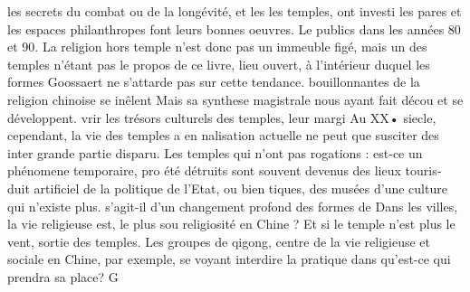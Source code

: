les secrets du combat ou de la longévité, et les les temples, ont investi les pares et les espaces philanthropes font leurs bonnes oeuvres. Le publics dans les années 80 et 90. La religion hors temple n'est donc pas un immeuble figé, mais un des temples n'étant pas le propos de ce livre, lieu ouvert, à l'intérieur duquel les formes Goossaert ne s'attarde pas sur cette tendance. bouillonnantes de la religion chinoise se inêlent Mais sa synthese magistrale nous ayant fait décou­ et se développent.	vrir les trésors culturels des temples, leur margi­ Au XX• siecle, cependant, la vie des temples a en nalisation actuelle ne peut que susciter des inter­ grande partie disparu. Les temples qui n'ont pas rogations : est-ce un phénomene temporaire, pro­ été détruits sont souvent devenus des lieux touris­ duit artificiel de la politique de l'Etat, ou bien tiques, des musées d'une culture qui n'existe plus. s'agit-il d'un changement profond des formes de Dans les villes, la vie religieuse est, le plus sou­  religiosité en Chine ? Et si le temple n'est plus le vent, sortie des temples. Les groupes de qigong, centre de la vie religieuse et sociale en Chine, par exemple, se voyant interdire la pratique dans  qu'est-ce qui prendra sa place? G


